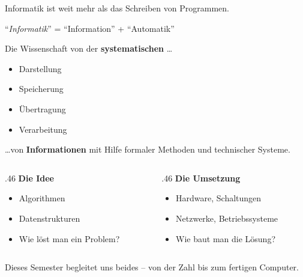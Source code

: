 \renewcommand{\thelektion}{L01 \textperiodcentered{} Was ist Informatik?}

\begin{frame}\end{frame}

\begin{frame}
Informatik ist weit mehr als das Schreiben von Programmen.
\vspace{3mm}
\begin{center}
\enquote{\textit{Informatik}} = \enquote{Information} + \enquote{Automatik}
\end{center}
\vspace{3mm}
Die Wissenschaft von der \textbf{systematischen} \ldots
\begin{itemize}\setlength\itemsep{4pt}
  \item Darstellung
  \item Speicherung
  \item Übertragung
  \item Verarbeitung
\end{itemize}
\ldots von \textbf{Informationen} mit Hilfe formaler Methoden und technischer Systeme.
\end{frame}

\begin{frame}
\begin{columns}[T,onlytextwidth]
\begin{column}{.46\textwidth}
  \large\bfseries\color{FDUteal}Die Idee
  \vspace{2mm}
  \normalsize\begin{itemize}\setlength\itemsep{6pt}
    \item Algorithmen
    \item Datenstrukturen
    \item Wie löst man ein Problem?
  \end{itemize}
\end{column}
\begin{column}{.46\textwidth}
  \large\bfseries\color{FDUblue}Die Umsetzung
  \vspace{2mm}
  \normalsize\begin{itemize}\setlength\itemsep{6pt}
    \item Hardware, Schaltungen
    \item Netzwerke, Betriebssysteme
    \item Wie baut man die Lösung?
  \end{itemize}
\end{column}
\end{columns}
\vfill\small\color{FDUteal}Dieses Semester begleitet uns beides -- von der Zahl bis zum fertigen Computer.
\end{frame}

